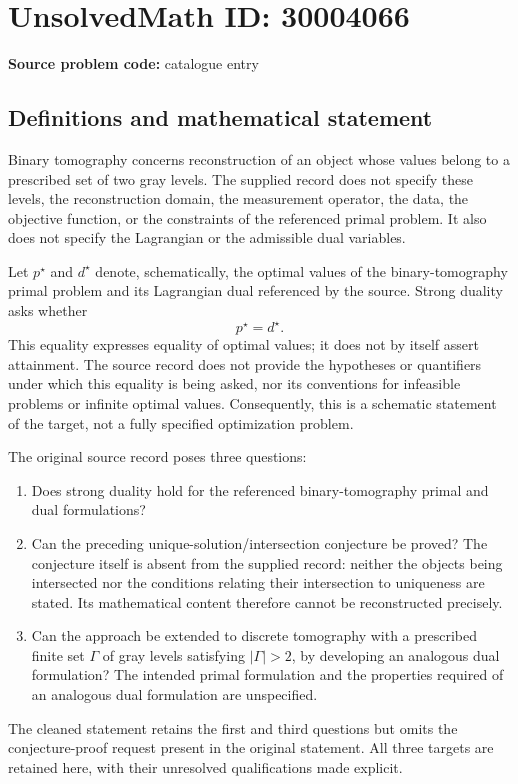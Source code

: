\documentclass[11pt]{article}
\begin{document}
\section*{UnsolvedMath ID: 30004066}
\textbf{Source problem code:} catalogue entry
\subsection{Definitions and mathematical statement}
Binary tomography concerns reconstruction of an object whose values belong to a prescribed set of two gray levels. The supplied record does not specify these levels, the reconstruction domain, the measurement operator, the data, the objective function, or the constraints of the referenced primal problem. It also does not specify the Lagrangian or the admissible dual variables.

Let \(p^\star\) and \(d^\star\) denote, schematically, the optimal values of the binary-tomography primal problem and its Lagrangian dual referenced by the source. Strong duality asks whether
\[
 p^\star=d^\star.
\]
This equality expresses equality of optimal values; it does not by itself assert attainment. The source record does not provide the hypotheses or quantifiers under which this equality is being asked, nor its conventions for infeasible problems or infinite optimal values. Consequently, this is a schematic statement of the target, not a fully specified optimization problem.

The original source record poses three questions:
\begin{enumerate}
\item Does strong duality hold for the referenced binary-tomography primal and dual formulations?
\item Can the preceding unique-solution/intersection conjecture be proved? The conjecture itself is absent from the supplied record: neither the objects being intersected nor the conditions relating their intersection to uniqueness are stated. Its mathematical content therefore cannot be reconstructed precisely.
\item Can the approach be extended to discrete tomography with a prescribed finite set \(\Gamma\) of gray levels satisfying \(\lvert\Gamma\rvert>2\), by developing an analogous dual formulation? The intended primal formulation and the properties required of an analogous dual formulation are unspecified.
\end{enumerate}
The cleaned statement retains the first and third questions but omits the conjecture-proof request present in the original statement. All three targets are retained here, with their unresolved qualifications made explicit.
\end{document}
